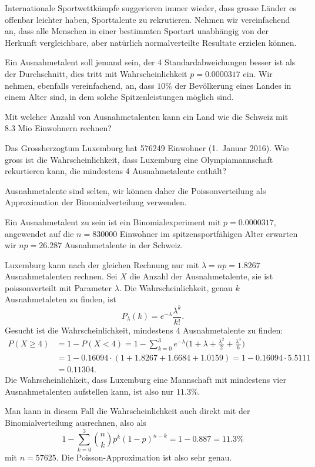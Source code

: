 Internationale Sportwettkämpfe suggerieren immer wieder, dass grosse
Länder es offenbar leichter haben, Sporttalente zu rekrutieren.
Nehmen wir vereinfachend an, dass alle Menschen in einer
bestimmten Sportart unabhängig von der Herkunft vergleichbare,
aber natürlich normalverteilte Resultate erzielen können.

Ein Ausnahmetalent soll jemand sein, der 4 Standardabweichungen besser ist
als der Durchschnitt, dies tritt mit Wahrscheinlichkeit $p = 0.0000317$ ein.
Wir nehmen, ebenfalls vereinfachend, an, dass $10\%$ der Bevölkerung
eines Landes in einem Alter sind, in dem solche Spitzenleistungen
möglich sind.
\begin{teilaufgaben}
\item
Mit welcher Anzahl von Ausnahmetalenten kann ein Land wie die Schweiz mit 
8.3 Mio Einwohnern rechnen?
\item
Das Grossherzogtum Luxemburg hat 576249 Einwohner (1.~Januar 2016).
Wie gross ist die Wahrscheinlichkeit, dass Luxemburg eine Olympiamannschaft
rekurtieren kann, die mindestens 4 Ausnahmetalente enthält?
\end{teilaufgaben}

\begin{loesung}
Ausnahmetalente sind selten, wir können daher die Poissonverteilung als
Approximation der Binomialverteilung verwenden.
\begin{teilaufgaben}
\item
Ein Ausnahmetalent zu sein ist ein Binomialexperiment mit $p=0.0000317$,
angewendet auf die $n=830000$ Einwohner im spitzensportfähigen Alter
erwarten wir $np=26.287$ Ausnahmetalente in der Schweiz.
\item
Luxemburg kann nach der gleichen Rechnung nur mit $\lambda=np=1.8267$
Ausnahmetalenten rechnen.
Sei $X$ die Anzahl der Ausnahmetalente, sie ist poissonverteilt mit
Parameter $\lambda$.
Die Wahrscheinlichkeit, genau $k$ Ausnahmetaleten zu finden, ist
\[
P_\lambda(k)=e^{-\lambda}\frac{\lambda^k}{k!}.
\]
Gesucht ist die Wahrscheinlichkeit, mindestens 4 Ausnahmetalente zu finden:
\begin{align*}
P(X \ge 4)
&=
1-P(X<4)=1-\sum_{k=0}^3 e^{-\lambda}\biggl(
1+\lambda+ \frac{\lambda^2}{2} + \frac{\lambda^3}{6}
\biggr)
\\
&=
1-0.16094\cdot(1+1.8267+1.6684+1.0159)
=
1-0.16094\cdot 5.5111\\
&=
0.11304.
\end{align*}
Die Wahrscheinlichkeit, dass Luxemburg eine Mannschaft mit mindestens
vier Ausnahmetalenten aufstellen kann, ist also nur $11.3\%$.

Man kann in diesem Fall die Wahrscheinlichkeit auch direkt mit der
Binomialverteilung ausrechnen, also als
\[
1-\sum_{k=0}^3\binom{n}{k}p^k(1-p)^{n-k}
=
1-0.887 = 11.3\%
\]
mit $n=57625$.
Die Poisson-Approximation ist also sehr genau.
\qedhere
\end{teilaufgaben}
\end{loesung}

